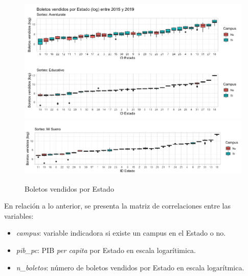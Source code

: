 \begin{figure}[H]
    \caption{Boletos vendidos por Estado}
    \label{fig:boxplot}
    \includegraphics[scale = 0.43]{Imagenes/boxplot1.png}
    \includegraphics[scale = 0.43]{Imagenes/boxplot2.png}
    \centering
\end{figure}


En relación a lo anterior, se presenta la matriz de correlaciones entre las variables: 

\begin{itemize}
    \item \textit{campus}: variable indicadora si existe un campus en el Estado o no.
    \item \textit{pib\_pc}: PIB \textit{per capita} por Estado en escala logarítimica. \\
    \item \textit{n\_boletos}: número de boletos vendidos por Estado en escala logarítmica.
\end{itemize} \\

